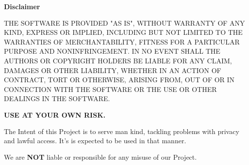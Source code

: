 \documentclass{slides}
\begin{document}
\newpage
\begin{center}
\textbf{\Large Disclaimer}
\end{center}
\begin{center}
THE SOFTWARE IS PROVIDED "AS IS", WITHOUT WARRANTY OF ANY KIND,
EXPRESS OR IMPLIED, INCLUDING BUT NOT LIMITED TO THE WARRANTIES OF
MERCHANTABILITY, FITNESS FOR A PARTICULAR PURPOSE AND NONINFRINGEMENT.
IN NO EVENT SHALL THE AUTHORS OR COPYRIGHT HOLDERS BE LIABLE FOR ANY
CLAIM, DAMAGES OR OTHER LIABILITY, WHETHER IN AN ACTION OF CONTRACT,
TORT OR OTHERWISE, ARISING FROM, OUT OF OR IN CONNECTION WITH THE
SOFTWARE OR THE USE OR OTHER DEALINGS IN THE SOFTWARE.
\end{center}
\begin{center}
\textbf{\large USE AT YOUR OWN RISK.}
\end{center}
\newpage
\begin{center}
The Intent of this Project is to serve man kind, tackling problems with privacy and lawful access.
It's is expected to be used in that manner.
\end{center}
\begin{center}
We are \textbf{NOT} liable or responsible for any misuse of our Project.
\end{center}
\end{document}
